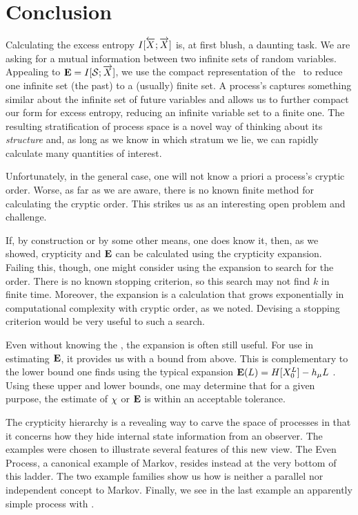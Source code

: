 \section{Conclusion}

Calculating the excess entropy $I[\smash{\overleftarrow {{X}}} ; \smash{\overrightarrow{{X}}}]$ is, at first blush, a
daunting task. We are asking for a mutual information between two infinite sets
of random variables. Appealing to ${\bf E} = I[\mathcal{S} ; \smash{\overrightarrow{{X}}}]$, we use the
compact representation of the \eM\ to reduce one infinite set (the past) to a
(usually) finite set. A process's  captures something similar
about the infinite set of future variables and allows us to further compact
our form for excess entropy, reducing an infinite variable set to a
finite one. The resulting stratification of process space is a novel way of
thinking about its \emph{structure} and, as long as we know in which stratum we
lie, we can rapidly calculate many quantities of interest.

Unfortunately, in the general case, one will not know a priori a process's
cryptic order. Worse, as far as we are aware, there is no known finite
method for calculating the cryptic order. This strikes us as an interesting
open problem and challenge.

If, by construction or by some other means, one does know it, then, as we
showed, crypticity and ${\bf E}$ can be calculated using the crypticity expansion.
Failing this, though, one might consider using the expansion to search for the
order. There is no known stopping criterion, so this search may not find $k$ 
in finite time. Moreover, the expansion is a calculation that grows
exponentially in computational complexity with cryptic order, as we noted.
Devising a stopping criterion would be very useful to such a search.

Even without knowing the , the expansion is often still useful. 
For use in estimating ${\bf E}$, it provides us with a bound from above. This is 
complementary to the lower bound one finds using the typical expansion 
${\bf E}(L) = H[{X}_0^L] - h_\mu L$ \cite{Crut01a}. Using these upper and
lower bounds, one may determine that for a given purpose, the estimate of
$\chi$ or ${\bf E}$ is within an acceptable tolerance.

The crypticity hierarchy is a revealing way to carve the space of processes
in that it concerns how they hide internal state information from an observer. 
The examples were chosen to illustrate several features of this new view. The 
Even Process, a canonical example of \order{\infty} Markov, resides instead at
the very bottom of this ladder. The two example families show us how 
is neither a parallel nor independent concept to  Markov. Finally, we
see in the last example an apparently simple process with \crypticity{\infty}. 

